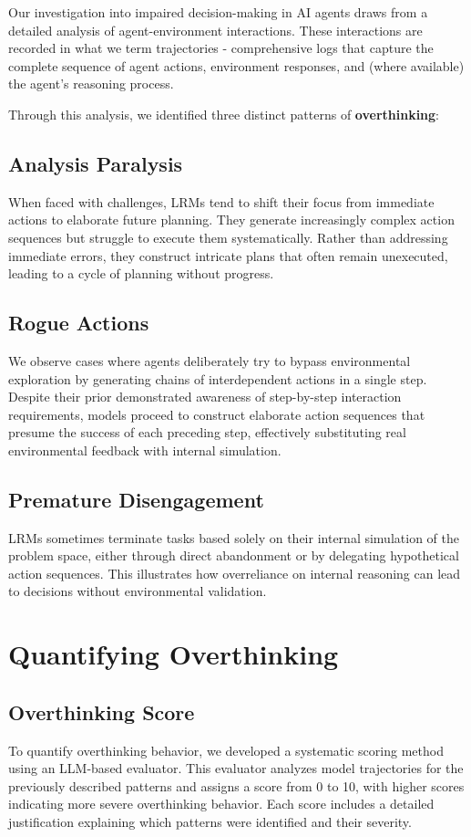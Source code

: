 Our investigation into impaired decision-making in AI agents draws from a detailed analysis of agent-environment interactions. These interactions are recorded in what we term trajectories - comprehensive logs that capture the complete sequence of agent actions, environment responses, and (where available) the agent's reasoning process.

Through this analysis, we identified three distinct patterns of \textbf{overthinking}:

\subsection{Analysis Paralysis}
When faced with challenges, LRMs tend to shift their focus from immediate actions to elaborate future planning. They generate increasingly complex action sequences but struggle to execute them systematically. Rather than addressing immediate errors, they construct intricate plans that often remain unexecuted, leading to a cycle of planning without progress.

\subsection{Rogue Actions}
We observe cases where agents deliberately try to bypass environmental exploration by generating chains of interdependent actions in a single step. Despite their prior demonstrated awareness of step-by-step interaction requirements, models proceed to construct elaborate action sequences that presume the success of each preceding step, effectively substituting real environmental feedback with internal simulation.

\subsection{Premature Disengagement}
LRMs sometimes terminate tasks based solely on their internal simulation of the problem space, either through direct abandonment or by delegating hypothetical action sequences. This illustrates how overreliance on internal reasoning can lead to decisions without environmental validation.

\section{Quantifying Overthinking}
\label{sec:quantifying}

\subsection{Overthinking Score}
To quantify overthinking behavior, we developed a systematic scoring method using an LLM-based evaluator. This evaluator analyzes model trajectories for the previously described patterns and assigns a score from 0 to 10, with higher scores indicating more severe overthinking behavior. Each score includes a detailed justification explaining which patterns were identified and their severity.

